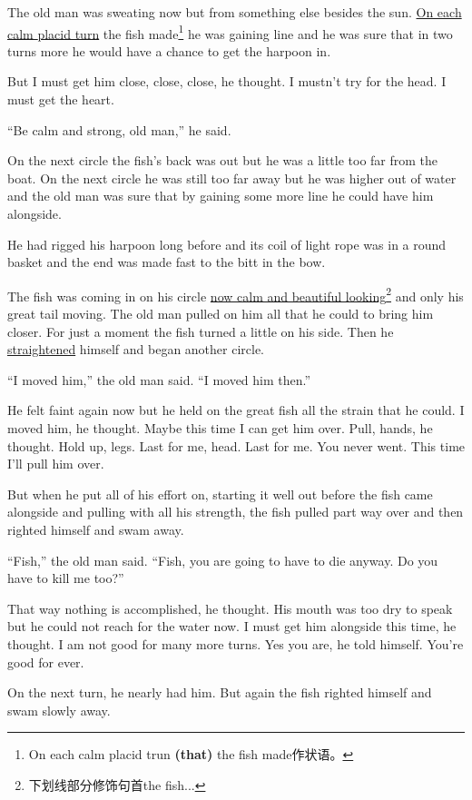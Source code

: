 \documentclass[fontset=ubuntu]{ctexrep}
\begin{document}
The old man was sweating now but from something else \gls{besides} the
sun. \uline{On each calm \gls{placid} turn} the fish made\footnote{On each calm
  placid trun \textbf{(that)} the fish made作状语。} he was gaining line and
he was sure that in two turns more he would have a chance to get the harpoon
in.

But I must get him close, close, close, he thought. I mustn't try for the
head. I must get the heart.

``Be calm and strong, old man,'' he said.

On the next circle the fish's back was out but he was a little too far from
the boat. On the next circle he was still too far away but he was higher out
of water and the old man was sure that by \gls{gaining} some more line he could
have him alongside.

He had rigged his harpoon long before and its coil of light rope was in a
round basket and the end was made fast to the bitt in the bow.

The fish was coming in on his circle \uline{now calm and beautiful
  looking}\footnote{下划线部分修饰句首the fish...} and only his great tail
moving. The old man pulled on him all that he could to bring him closer. For
just a moment the fish turned a little on his side. Then he
\uline{straightened} himself and began another circle.

``I moved him,'' the old man said. ``I moved him then.''

He felt faint again now but he held on the great fish all the strain that he
could. I moved him, he thought. Maybe this time I can get him over. Pull,
hands, he thought. Hold up, legs. Last for me, head. Last for me. You never
went. This time I'll pull him over.

But when he put all of his effort on, starting it well out before the fish
came alongside and pulling with all his strength, the fish pulled part way
over and then righted himself and swam away.

``Fish,'' the old man said. ``Fish, you are going to have to die anyway. Do
you have to kill me too?''

That way nothing is \gls{accomplished}, he thought. His mouth was too dry to
speak but he could not reach for the water now. I must get him alongside
this time, he thought. I am not good for many more turns. Yes you are, he
told himself. You're good for ever.

On the next turn, he nearly had him. But again the fish righted himself and
swam slowly away.
\end{document}
